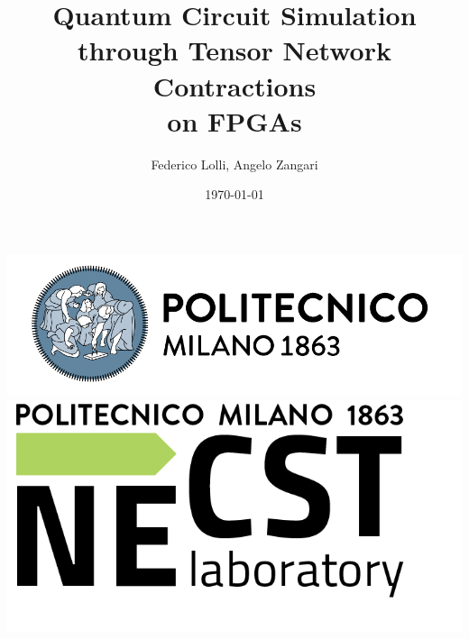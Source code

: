 \documentclass[12pt,oneside,a4paper]{article}
\title{\textbf{Quantum Circuit Simulation through Tensor Network Contractions \\ on FPGAs}}
\author{Federico Lolli, Angelo Zangari}
\date{\today}
\begin{document}
\begin{titlepage}
    \centering
    \clearpage
    \maketitle
	\thispagestyle{empty}
	\vspace*{1cm}
	\vfill
	\centering
	\includegraphics{logo_polimi.png}\includegraphics{logo_NECST.png}
\end{titlepage}
\end{document}
